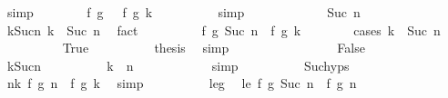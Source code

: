 \begin{isabellebody}
\ simp\isanewline
\ \ \ \ \ \ \isamarkupfalse%
\ {\isachardoublequoteopen}f\ {\isacharparenleft}g\ {}{\isacharparenright}\ {\isacharequal}\ f\ {\isacharparenleft}g\ k{\isacharparenright}{\isachardoublequoteclose}\isanewline
\ \ \ \ \ \ \ \ \isamarkupfalse%
\ simp\isanewline
\ \ \ \ \isamarkupfalse%
\isanewline
\ \ \ \ \ \ \isamarkupfalse%
\ {\isacharparenleft}Suc\ n{\isacharparenright}\isanewline
\ \ \ \ \ \ \isamarkupfalse%
\ k{\isacharunderscore}Suc{\isacharunderscore}n{\isacharcolon}\ {\isachardoublequoteopen}k\ {\isasymle}\ Suc\ n{\isachardoublequoteclose}\ \isamarkupfalse%
\ fact\isanewline
\ \ \ \ \ \ \isamarkupfalse%
\ \isamarkupfalse%
\ {\isachardoublequoteopen}f\ {\isacharparenleft}g\ {\isacharparenleft}Suc\ n{\isacharparenright}{\isacharparenright}\ {\isacharequal}\ f\ {\isacharparenleft}g\ k{\isacharparenright}{\isachardoublequoteclose}\isanewline
\ \ \ \ \ \ \isamarkupfalse%
\ {\isacharparenleft}cases\ {\isachardoublequoteopen}k\ {\isacharequal}\ Suc\ n{\isachardoublequoteclose}{\isacharparenright}\isanewline
\ \ \ \ \ \ \ \ \isamarkupfalse%
\ True\isanewline
\ \ \ \ \ \ \ \ \isamarkupfalse%
\ {\isacharquery}thesis\ \isamarkupfalse%
\ simp\isanewline
\ \ \ \ \ \ \isamarkupfalse%
\isanewline
\ \ \ \ \ \ \ \ \isamarkupfalse%
\ False\isanewline
\ \ \ \ \ \ \ \ \isamarkupfalse%
\ k{\isacharunderscore}Suc{\isacharunderscore}n\isanewline
\ \ \ \ \ \ \ \ \isamarkupfalse%
\ {\isachardoublequoteopen}k\ {\isasymle}\ n{\isachardoublequoteclose}\isanewline
\ \ \ \ \ \ \ \ \ \ \isamarkupfalse%
\ simp\isanewline
\ \ \ \ \ \ \ \ \isamarkupfalse%
\ Suc{\isachardot}hyps\isanewline
\ \ \ \ \ \ \ \ \isamarkupfalse%
\ n{\isacharunderscore}k{\isacharcolon}\ {\isachardoublequoteopen}f\ {\isacharparenleft}g\ n{\isacharparenright}\ {\isacharequal}\ f\ {\isacharparenleft}g\ k{\isacharparenright}{\isachardoublequoteclose}\ \isamarkupfalse%
\ simp\isanewline
\ \ \ \ \ \ \ \ \isamarkupfalse%
\ le{\isacharunderscore}g\ \isamarkupfalse%
\ le{\isacharcolon}\ {\isachardoublequoteopen}f\ {\isacharparenleft}g\ {\isacharparenleft}Suc\ n{\isacharparenright}{\isacharparenright}\ {\isasymle}\ f\ {\isacharparenleft}g\ n{\isacharparenright}{\isachardoublequoteclose}\isanewline
\ \ \ \ \ \ \ \ \ \ \isamarkupfalse%

\end{isabellebody}
